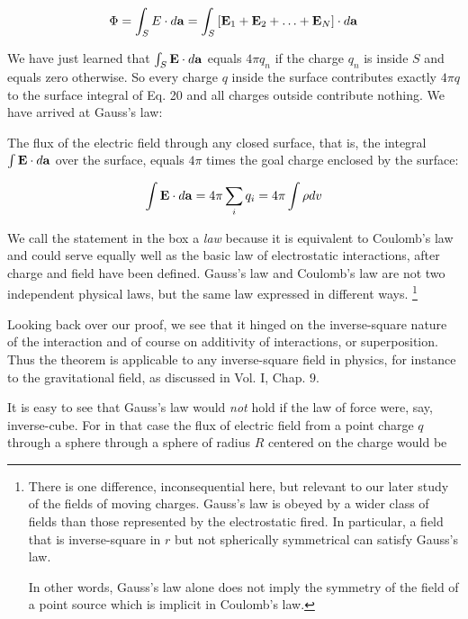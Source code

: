 \begin{equation}
  \Phi =  \int\nolimits_{S}{} E \cdot d
  \mathbf{a} =  \int\nolimits_{{S}}{}[\mathbf{E}_1 +
  \mathbf{E}_2 + \ldots + \mathbf{E}_N] \cdot d \mathbf{a} 
\end{equation}

We have just learned that $\int\nolimits_{S}{} \mathbf{E} \cdot d\mathbf{a}$
equals $4 \pi q_n$ if the charge $q_n$ is inside $S$ and
equals zero otherwise. So every charge $q$ inside the surface
contributes exactly $4 \pi q$ to the surface integral of Eq. 20 and
all charges outside contribute nothing. We have arrived at Gauss's
law:

\begin{framed}
The flux of the electric field  through any closed surface,
that is, the integral $\int {\ensuremath{\mathbf{E}}} \cdot d \mathbf{a}$ over
the surface, equals $4\pi$ times the goal charge enclosed by the
surface:

\begin{equation} 
  \int {\ensuremath{\mathbf{E}}} \cdot d \mathbf{a} =  4\pi \sum_i q_i =  4\pi \int \rho dv 
\end{equation}
\end{framed}

We call the statement in the box a \emph{law} because it is
equivalent to Coulomb's law and could serve equally well as the basic
law of electrostatic interactions, after charge and field have been
defined. Gauss's law and Coulomb's law are not two independent
physical laws, but the same law expressed in different ways.
\footnote{There is one difference, inconsequential here, but relevant
to our later study of the fields of moving charges. Gauss's law is
obeyed by a wider class of fields than those represented by the
electrostatic fired. In particular, a field that is inverse-square in
$r$ but not spherically symmetrical can satisfy Gauss's law.

In other words, Gauss's law alone does not imply the symmetry of the
field of a point source which is implicit in Coulomb's law.}

Looking back over our proof, we see that it hinged on the
inverse-square nature of the interaction and of course on additivity
of interactions, or superposition. Thus the theorem is applicable to
any inverse-square field in physics, for instance to the
gravitational field, as discussed in Vol. I, Chap. $9$.

It is easy to see that Gauss's law would \emph{not} hold if the law
of force were, say, inverse-cube. For in that case the flux of
electric field 
from a point charge $q$ through a sphere
through a sphere of radius $R$ centered on the charge would be

